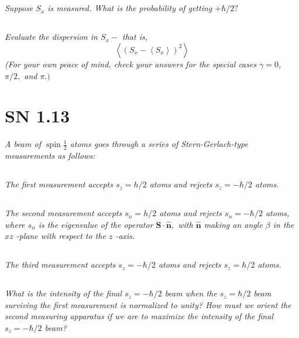 \documentclass{article}
\begin{document}
\subsection{}
\textit{Suppose $S_{x}$ is measured. What is the probability of getting $+\hbar / 2 ?$}

\subsection{}
\textit{Evaluate the dispersion in $S_{x}-$ that is,
$$
\left\langle\left(S_{x}-\left\langle S_{x}\right\rangle\right)^{2}\right\rangle
$$
(For your own peace of mind, check your answers for the special cases $\gamma=0$, $\pi / 2,$ and $\pi .)$}

\newpage


\section{SN 1.13}
\textit{A beam of $\operatorname{spin} \frac{1}{2}$ atoms goes through a series of Stern-Gerlach-type measurements as follows:}

\subsection{}
\textit{The first measurement accepts $s_{z}=h / 2$ atoms and rejects $s_{z}=-\hbar / 2$ atoms. }


\subsection{}
\textit{The second measurement accepts $s_{n}=h / 2$ atoms and rejects $s_{n}=-\hbar / 2$ atoms, where $s_{n}$ is the eigenvalue of the operator $\mathbf{S} \cdot \hat{\mathbf{n}},$ with $\hat{\mathbf{n}}$ making an angle $\beta$ in the $x z$ -plane with respect to the $z$ -axis.}


\subsection{}
\textit{The third measurement accepts $s_{z}=-\hbar / 2$ atoms and rejects $s_{z}=\hbar / 2$ atoms.}

\subsection*{}
\textit{What is the intensity of the final $s_{z}=-\hbar / 2$ beam when the $s_{z}=\hbar / 2$ beam surviving the first measurement is normalized to unity? How must we orient the second measuring apparatus if we are to maximize the intensity of the final $s_{z}=-\hbar / 2$ beam?}
\end{document}
